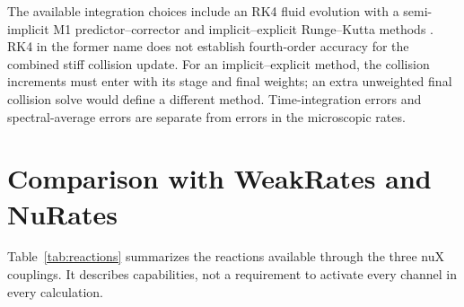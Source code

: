 \documentclass[aps,prd,reprint,nofootinbib,notitlepage]{revtex4-2}
\begin{document}
The available integration choices include an RK4 fluid evolution with a
semi-implicit M1 predictor--corrector and implicit--explicit Runge--Kutta
methods \cite{Izquierdo2023}. RK4 in the former name does not establish
fourth-order accuracy for the combined stiff collision update. For an
implicit--explicit method, the collision increments must enter with its
stage and final weights; an extra unweighted final collision solve would
define a different method. Time-integration errors and spectral-average
errors are separate from errors in the microscopic rates.

\section{Comparison with WeakRates and NuRates}

Table~\ref{tab:reactions} summarizes the reactions available through the
three nuX couplings. It describes capabilities, not a requirement to
activate every channel in every calculation.
\end{document}
